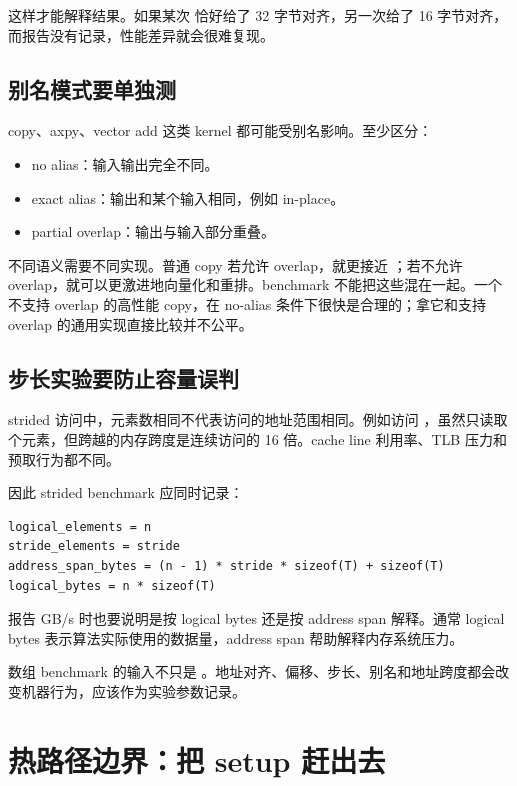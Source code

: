 这样才能解释结果。如果某次  恰好给了 32 字节对齐，另一次给了 16 字节对齐，而报告没有记录，性能差异就会很难复现。

\subsection{别名模式要单独测}

copy、axpy、vector add 这类 kernel 都可能受别名影响。至少区分：

\begin{itemize}
  \item no alias：输入输出完全不同。
  \item exact alias：输出和某个输入相同，例如 in-place。
  \item partial overlap：输出与输入部分重叠。
\end{itemize}

不同语义需要不同实现。普通 copy 若允许 overlap，就更接近 ；若不允许 overlap，就可以更激进地向量化和重排。benchmark 不能把这些混在一起。一个不支持 overlap 的高性能 copy，在 no-alias 条件下很快是合理的；拿它和支持 overlap 的通用实现直接比较并不公平。

\subsection{步长实验要防止容量误判}

strided 访问中，元素数相同不代表访问的地址范围相同。例如访问 ，虽然只读取  个元素，但跨越的内存跨度是连续访问的 16 倍。cache line 利用率、TLB 压力和预取行为都不同。

因此 strided benchmark 应同时记录：

\begin{lstlisting}
logical_elements = n
stride_elements = stride
address_span_bytes = (n - 1) * stride * sizeof(T) + sizeof(T)
logical_bytes = n * sizeof(T)
\end{lstlisting}

报告 GB/s 时也要说明是按 logical bytes 还是按 address span 解释。通常 logical bytes 表示算法实际使用的数据量，address span 帮助解释内存系统压力。

\begin{keyidea}
数组 benchmark 的输入不只是 。地址对齐、偏移、步长、别名和地址跨度都会改变机器行为，应该作为实验参数记录。
\end{keyidea}

\section{热路径边界：把 setup 赶出去}


